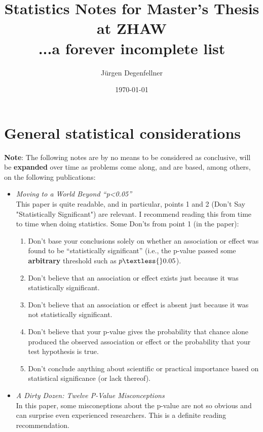 \documentclass[12pt,a4paper]{article}
\title{Statistics Notes for Master's Thesis at ZHAW\\
...a forever incomplete list}
\author{Jürgen Degenfellner}
\date{\today}
\begin{document}
\maketitle

\section{General statistical considerations}

\noindent \textbf{Note}: The following notes are by no means to be considered as conclusive, will be \textbf{expanded} over time as problems come along, and are based, among others, on the following publications:

\begin{itemize}

\item \textit{Moving to a World Beyond “p\textless{}0.05”} \cite{Wasserstein2019}\\
This paper is quite readable, and in particular, points 1 and 2 (Don't Say "Statistically Significant") are relevant. I recommend reading this from time to time when doing statistics. Some Don'ts from point 1 (in the paper):
    \begin{enumerate}
        \item Don’t base your conclusions solely on whether an association or effect was found to be “statistically significant” (i.e., the p-value passed some \textbf{arbitrary} threshold such as \( p \textless{} 0.05 \)).
        \item Don’t believe that an association or effect exists just because it was statistically significant.
        \item Don’t believe that an association or effect is absent just because it was not statistically significant.
        \item Don’t believe that your p-value gives the probability that chance alone produced the observed association or effect or the probability that your test hypothesis is true.
        \item Don’t conclude anything about scientific or practical importance based on statistical significance (or lack thereof).
    \end{enumerate}

\item \textit{A Dirty Dozen: Twelve P-Value Misconceptions} \cite{Goodman2008}\\
In this paper, some misconeptions about the p-value are not so obvious and can surprise even experienced researchers. This is a definite reading recommendation.


\end{itemize}
\end{document}
